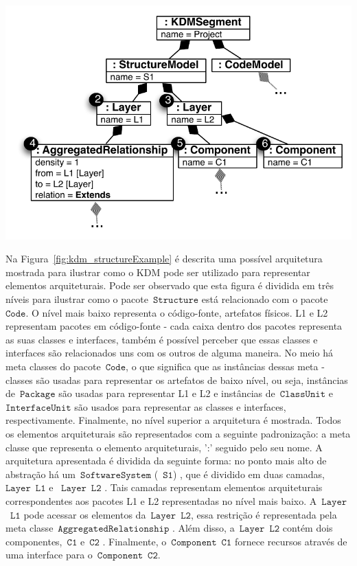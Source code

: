 \begin{minipage}{.55\textwidth}
	\centering
	\includegraphics[scale=0.67]{images/StructureKDMINstance}
	\label{fig:kdm_instance_StructureExample}
\end{minipage}

Na Figura~\ref{fig:kdm_structureExample} é descrita uma possível arquitetura mostrada para ilustrar como o KDM pode ser utilizado para representar elementos arquiteturais. Pode ser observado que esta figura é dividida em três níveis para ilustrar como o pacote~$\mathtt{Structure}$ está relacionado com o pacote~$\mathtt{Code}$. O nível mais baixo representa o código-fonte, artefatos físicos. L1 e L2 representam pacotes em código-fonte - cada caixa dentro dos pacotes representa as suas classes e interfaces, também é possível perceber que essas classes e interfaces são relacionados uns com os outros de alguma maneira. No meio há meta classes do pacote~$\mathtt{Code}$, o que significa que as instâncias dessas meta -classes são usadas para representar os artefatos de baixo nível, ou seja, instâncias de~$\mathtt{Package}$ são usadas para representar L1 e L2 e instâncias de~$\mathtt{ClassUnit}$ e~$\mathtt{InterfaceUnit}$ são usados para representar as classes e interfaces, respectivamente. Finalmente, no nível superior a arquitetura é mostrada. Todos os elementos arquiteturais são representados com a seguinte padronização: a meta classe que representa o elemento arquiteturais, ':' seguido pelo seu nome. A arquitetura apresentada é dividida da seguinte forma: no ponto mais alto de abstração há um~$\mathtt{SoftwareSystem}$ (~$\mathtt{S1}$) , que é dividido em duas camadas, ~$\mathtt{Layer}$~$\mathtt{L1}$  e ~$\mathtt{Layer}$~$\mathtt{L2}$ . Tais camadas representam elementos arquiteturais correspondentes aos pacotes L1 e L2 representadas no nível mais baixo. A~$\mathtt{Layer}$~$\mathtt{L1}$ pode acessar os elementos da~$\mathtt{Layer}$~$\mathtt{L2}$, essa restrição  é representada pela meta classe~$\mathtt{AggregatedRelationship}$ . Além disso, a~$\mathtt{Layer}$~$\mathtt{L2}$ contém dois componentes,~$\mathtt{C1}$  e~$\mathtt{C2}$ . Finalmente, o~$\mathtt{Component}$~$\mathtt{C1}$ fornece recursos através de uma interface para o~$\mathtt{Component}$~$\mathtt{C2}$.

